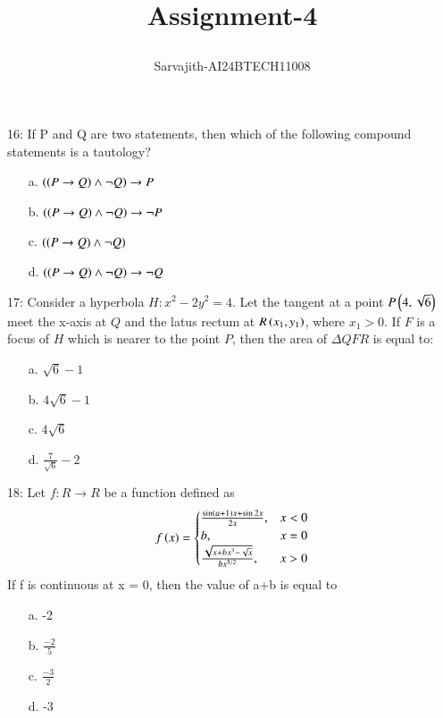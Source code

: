 \documentclass[journal,12pt,twocolumn]{IEEEtran}
\title{Assignment-4

}
\author{Sarvajith-AI24BTECH11008}
\theoremstyle{remark}
\begin{document}
\maketitle


16: If P and Q are two statements, then which of the following compound statements is a tautology?

\begin{enumerate}
    \item [a.] $\left(\left(P\rightarrow Q\right)\land \neg Q\right)\rightarrow P$
    \item [b.] $\left(\left(P\rightarrow Q\right)\land \neg Q\right)\rightarrow \neg P$
    \item [c.] $\left(\left(P\rightarrow Q\right)\land \neg Q\right)$
    \item [d.] $\left(\left(P\rightarrow Q\right)\land \neg Q\right)\rightarrow \neg Q$
\end{enumerate}
17:  Consider a hyperbola $H : x^2 - 2y^2 = 4$. Let the tangent at a point $P \left(4, \sqrt{6}\right)$ meet the x-axis at $Q$ and the latus rectum at $ R \left(x_1, y_1\right)$, where  $x_1 > 0$. If $ F $ is a focus of $H$  which is nearer to the point  $P$, then the area of $\Delta QFR$ is equal to:
\begin{multicols}{2}
\begin{enumerate}
    \item [a.] $\sqrt{6}-1$
    \item [b.] $4\sqrt{6}-1$
	    \columnbreak
    \item [c.] $4\sqrt{6}$
    \item [d.] $\frac{7}{\sqrt{6}}-2$
\end{enumerate}
\end{multicols}
18: Let $f:R\rightarrow R$ be a function defined as 
$$f\left(x\right) = \begin{cases}
    \frac{\sin\left(a+1\right)x + \sin 2x}{2x}, & x<0\\
    b, & x=0\\
    \frac{\sqrt{x+bx^3-\sqrt{x}}}{bx^{5/2}}, & x>0
\end{cases}$$
If f is continuous at x = 0, then the value of a+b is equal to
\begin{multicols}{2}
\begin{enumerate}
    \item [a.] -2
    \item [b.] $\frac{-2}{5}$
	    \columnbreak
    \item [c.] $\frac{-3}{2}$
    \item [d.] -3
\end{enumerate}
\end{multicols}
\end{document}
